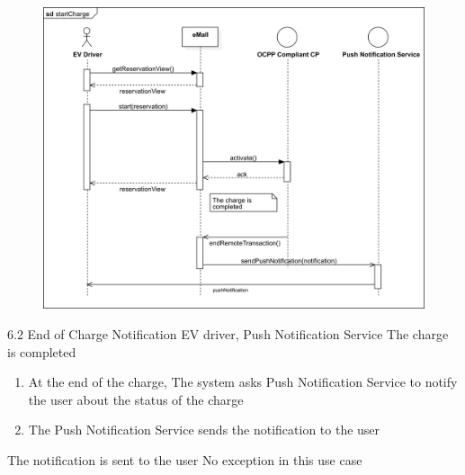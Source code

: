 \usecase
{
    \begin{figure}[H]
        \centering
        \includegraphics[scale=0.8]{src/sequence_diagram/startCharge.png}
    \end{figure}
}
{6.2}
{End of Charge Notification}
{EV driver, Push Notification Service}
{The charge is completed}
{
    \begin{enumerate}
        \item At the end of the charge, The system asks Push Notification Service to notify the user about the status of the charge
        \item The Push Notification Service sends the notification to the user
    \end{enumerate}
}
{The notification is sent to the user}
{
    No exception in this use case
}
{
}

